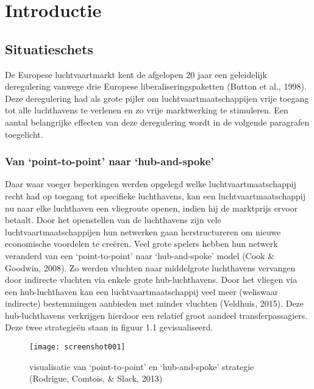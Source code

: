 \chapter{Introductie}

\section{Situatieschets}
De Europese luchtvaartmarkt kent de afgelopen 20 jaar een geleidelijk deregulering vanwege drie Europese liberaliseringspaketten (Button et al., 1998). Deze deregulering had als grote pijler om luchtvaartmaatschappijen vrije toegang tot alle luchthavens te verlenen en zo vrije marktwerking te stimuleren. Een aantal belangrijke effecten van deze deregulering wordt in de volgende paragrafen toegelicht.
\subsection{Van ‘point-to-point’ naar ‘hub-and-spoke’}
Daar waar voeger beperkingen werden opgelegd welke luchtvaartmaatschappij recht had op toegang tot specifieke luchthavens, kan een luchtvaartmaatschappij nu naar elke luchthaven een vliegroute openen, indien hij de marktprijs ervoor betaalt. Door het openstellen van de luchthavens zijn vele luchtvaartmaatschappijen hun netwerken gaan herstructureren om nieuwe economische voordelen te creëren. Veel grote spelers hebben hun netwerk veranderd van een ‘point-to-point’ naar ‘hub-and-spoke’ model (Cook \& Goodwin, 2008). Zo werden vluchten naar middelgrote luchthavens vervangen door indirecte vluchten via enkele grote hub-luchthavens. Door het vliegen via een hub-luchthaven kan een luchtvaartmaatschappij veel meer (weliswaar indirecte) bestemmingen aanbieden met minder vluchten (Veldhuis, 2015). Deze hub-luchthavens verkrijgen hierdoor een relatief groot aandeel transferpassagiers. Deze twee strategieën staan in figuur 1.1 gevisualiseerd. \\
\begin{figure}[h]
	\centering
	\texttt{[image: screenshot001]}
	\caption{visualisatie van ‘point-to-point’ en ‘hub-and-spoke’ strategie (Rodrigue, Comtois, \& Slack, 2013)}
	\label{fig:screenshot001}
\end{figure}
